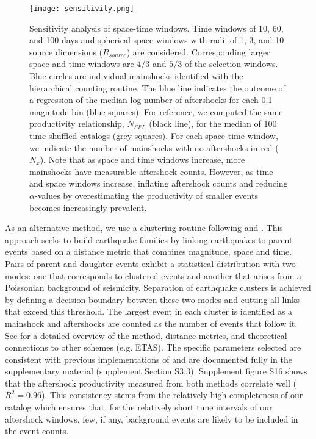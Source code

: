 \documentclass[draft, jgrga]{agujournal2018}
\begin{document}
\begin{figure}
    \centering
    \texttt{[image: sensitivity.png]}
    \caption{Sensitivity analysis of space-time windows. Time windows of 10, 60, and 100 days and spherical space windows with radii of 1, 3, and 10 source dimensions ($R_{source}$) are considered. Corresponding larger space and time windows are $4/3$ and $5/3$ of the selection windows. Blue circles are individual mainshocks identified with the hierarchical counting routine. The blue line indicates the outcome of a regression of the median log-number of aftershocks for each 0.1 magnitude bin (blue squares). For reference, we computed the same productivity relationship, $N_{SFL}$ (black line), for the median of 100 time-shuffled catalogs (grey squares). For each space-time window, we indicate the number of mainshocks with no aftershocks in red ($N_x$). Note that as space and time windows increase, more mainshocks have measurable aftershock counts. However, as time and space windows increase, inflating aftershock counts and reducing $\alpha$-values by overestimating the productivity of smaller events becomes increasingly prevalent.
}
    \label{fig:sensitivity}
\end{figure}

As an alternative method, we use a clustering routine following \citet{Zaliapin2008} and \citet{Goebel2019AftershockOklahoma}. This approach seeks to build earthquake families by linking earthquakes to parent events based on a distance metric that combines magnitude, space and time. Pairs of parent and daughter events exhibit a statistical distribution with two modes: one that corresponds to clustered events and another that arises from a Poissonian background of seismicity. Separation of earthquake clusters is achieved by defining a decision boundary between these two modes and cutting all links that exceed this threshold. The largest event in each cluster is identified as a mainshock and aftershocks are counted as the number of events that follow it. See \citet{Zaliapin2008} for a detailed overview of the method, distance metrics, and theoretical connections to other schemes (e.g. ETAS). The specific parameters selected are consistent with previous implementations of \citet{Zaliapin2008} and are documented fully in the supplementary material (supplement Section S3.3). Supplement figure S16 shows that the aftershock productivity measured from both methods correlate well ($R^2=0.96$). This consistency stems from the relatively high completeness of our catalog which ensures that, for the relatively short time intervals of our aftershock windows, few, if any, background events are likely to be included in the event counts.
\end{document}

